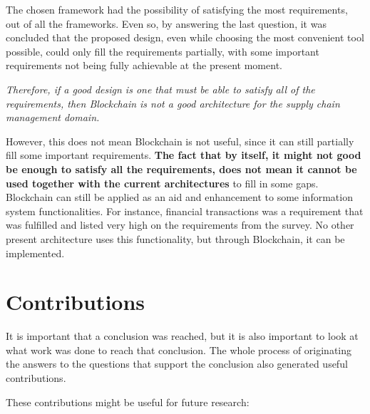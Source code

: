 \par The chosen framework had the possibility of satisfying the most requirements, out of all the frameworks. Even so, by answering the last question, it was concluded that the proposed design, even while choosing the most convenient tool possible, could only fill the requirements partially, with some important requirements not being fully achievable at the present moment.


\emph{Therefore, if a good design is one that must be able to satisfy all of the requirements, then Blockchain is not a good architecture for the supply chain management domain.}


However, this does not mean Blockchain is not useful, since it can still partially fill some important requirements. \textbf{The fact that by itself, it might not good be enough to satisfy all the requirements, does not mean it cannot be used together with the current architectures} to fill in some gaps. Blockchain can still be applied as an aid and enhancement to some information system functionalities. For instance, financial transactions was a requirement that was fulfilled and listed very high on the requirements from the survey. No other present architecture uses this functionality, but through Blockchain, it can be implemented.

\section{Contributions}
It is important that a conclusion was reached, but it is also important to look at what work was done to reach that conclusion. The whole process of originating the answers to the questions that support the conclusion also generated useful contributions. 

These contributions might be useful for future research:

